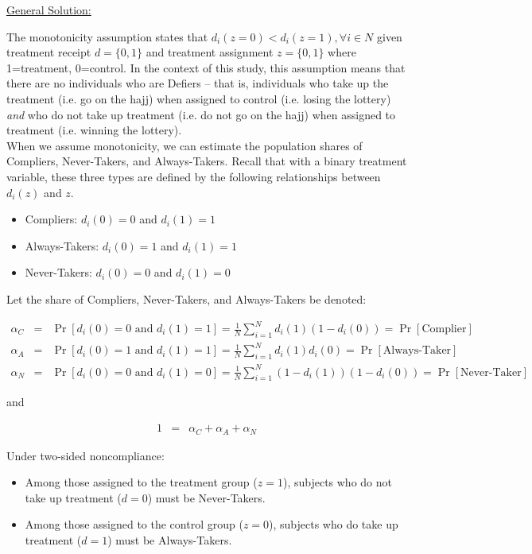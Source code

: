 \documentclass[11pt,notitlepage]{article}
\def\Pr{\mathop{\text{Pr}}}
\begin{document}
\vspace{1cm}


\underline{{\sc General Solution:}}

The monotonicity assumption states that $d_i(z=0) < d_i(z=1), \forall i \in N$ given treatment receipt $d = \lbrace 0, 1 \rbrace$ and treatment assignment $z = \lbrace 0, 1 \rbrace$ where 1=treatment, 0=control. In the context of this study, this assumption means that there are no individuals who are Defiers -- that is, individuals who take up the treatment (i.e. go on the hajj) when assigned to control (i.e. losing the lottery) {\em and} who do not take up treatment (i.e. do not go on the hajj) when assigned to treatment (i.e. winning the lottery).\\

When we assume monotonicity, we can estimate the population shares of Compliers, Never-Takers, and Always-Takers. Recall that with a binary treatment variable, these three types are defined by the following relationships between $d_i(z)$ and $z$.

\begin{itemize}
\item Compliers: $d_i(0) = 0$ and $d_i(1) = 1$
\item Always-Takers: $d_i(0) = 1$ and $d_i(1) = 1$
\item Never-Takers:  $d_i(0) = 0$ and $d_i(1) = 0$
\end{itemize}

Let the share of Compliers, Never-Takers, and Always-Takers be denoted:

\begin{eqnarray*}
\alpha_C &=& \Pr[ d_i(0) = 0 \text{ and } d_i(1) = 1 ] = \frac{1}{N} \sum_{i=1}^N d_i(1)(1-d_i(0))  = \Pr[\text{Complier}] \\
\alpha_A &=& \Pr[ d_i(0) = 1 \text{ and } d_i(1) = 1 ] = \frac{1}{N} \sum_{i=1}^N d_i(1)d_i(0) = \Pr[\text{Always-Taker}] \\
\alpha_N &=& \Pr[ d_i(0) = 0 \text{ and } d_i(1) = 0 ] = \frac{1}{N} \sum_{i=1}^N (1 - d_i(1))(1-d_i(0)) = \Pr[\text{Never-Taker}] 
\end{eqnarray*}

and

\begin{eqnarray*}
1 &=& \alpha_C + \alpha_A + \alpha_N
\end{eqnarray*}

Under two-sided noncompliance:

\begin{itemize}
\item Among those assigned to the treatment group ($z=1$), subjects who do not take up treatment ($d=0$) must be Never-Takers.
\item Among those assigned to the control group ($z=0$), subjects who do take up treatment ($d=1$) must be Always-Takers.
\end{itemize}
\end{document}
